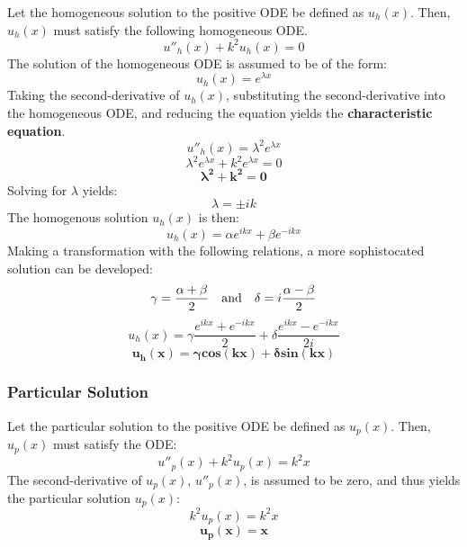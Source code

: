 \documentclass[10pt, reqno]{article}		%
\numberwithin{equation}{section}
\begin{document}
Let the homogeneous solution to the positive ODE be defined as $u_h(x)$. Then, $u_h(x)$ must satisfy the following homogeneous ODE.
\begin{equation}
u''_h(x) + k^2u_h(x) = 0
\end{equation}
The solution of the homogeneous ODE is assumed to be of the form: 
\begin{equation}
u_h(x) = e^{\lambda x}
\end{equation}
Taking the second-derivative of $u_h(x)$, substituting the second-derivative into the homogeneous ODE, and reducing the equation yields the \textbf{characteristic equation}.
\begin{equation}
u''_h(x) = \lambda^2 e^{\lambda x}
\end{equation}
\begin{equation}
\lambda^2 e^{\lambda x} + k^2e^{\lambda x} = 0
\end{equation}
\begin{equation}
\mathbf{\lambda^2 + k^2 = 0}
\end{equation}
Solving for $\lambda$ yields:
\begin{equation}
\lambda = \pm ik
\end{equation}
The homogenous solution $u_h(x)$ is then:
\begin{equation}
u_h(x) = \alpha e^{ikx} + \beta e^{-ikx}
\end{equation}
Making a transformation with the following relations, a more sophistocated solution can be developed:
\begin{equation}
\gamma = \frac{\alpha+\beta}{2} \quad \textnormal{and} \quad \delta = i\frac{\alpha-\beta}{2}
\end{equation}
\begin{equation}
u_h(x) = \gamma \frac{e^{ikx}+e^{-ikx}}{2} + \delta \frac{e^{ikx}-e^{-ikx}}{2i}
\end{equation}
\begin{equation}
\mathbf{u_h(x) = \gamma cos(kx) + \delta sin(kx)}
\end{equation}

\subsubsection{Particular Solution}

Let the particular solution to the positive ODE be defined as $u_p(x)$. Then, $u_p(x)$ must satisfy the ODE:
\begin{equation}
u''_p(x) + k^2u_p(x) = k^2x
\end{equation}
The second-derivative of $u_p(x)$, $u''_p(x)$, is assumed to be zero, and thus yields the particular solution $u_p(x)$:
\begin{equation}
k^2u_p(x) = k^2x
\end{equation}
\begin{equation}
\mathbf{u_p(x) = x}
\end{equation}
\end{document}
